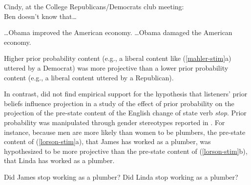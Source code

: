 \documentclass[11pt,fleqn]{article}
\newcommand{\6}{\mbox{$[\hspace*{-.6mm}[$}}
\newcommand{\9}{\mbox{$]\hspace*{-.6mm}]$}}
\begin{document}
\begin{exe}
\ex\label{mahler-stim} Cindy, at the College Republicans/Democrats club meeting: \\ Ben doesn't know that\ldots
\begin{xlist}
\ex \ldots Obama improved the American economy.
\ex \ldots Obama damaged the American economy. \hfill \cite[784f.]{mahler2020}
\end{xlist}
\end{exe}
Higher prior probability content (e.g., a liberal content like (\ref{mahler-stim}a) uttered by a Democrat) was more projective than a lower prior probability content (e.g., a liberal content uttered by a Republican). %

In contrast,  did not find empirical support for the hypothesis that listeners' prior beliefs influence projection %
in a study of the effect of prior probability on the projection of the pre-state content of the English change of state verb {\em stop}. Prior probability was manipulated through gender stereotypes reported in . For instance, because men are more likely than women to be plumbers, the pre-state content of (\ref{lorson-stim}a), that James has worked as a plumber, was hypothesized to be more projective than the pre-state content of (\ref{lorson-stim}b), that Linda has worked as a plumber.

\begin{exe}
\ex\label{lorson-stim} 
\begin{xlist}
\ex Did James stop working as a plumber?
\ex Did Linda stop working as a plumber? \hfill \cite[38]{lorson2018}
\end{xlist}
\end{exe}
\end{document}

